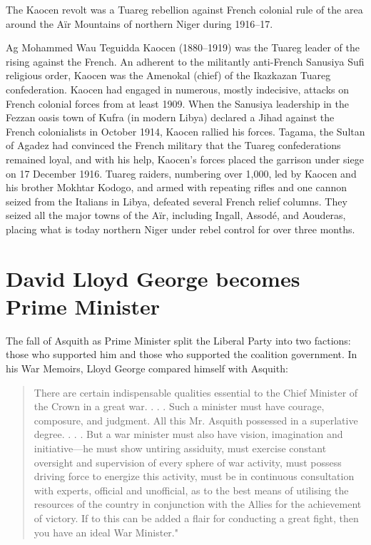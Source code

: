 \documentclass[a4paper,]{book}
\begin{document}
The Kaocen revolt was a Tuareg rebellion against French colonial rule of the area around the Aïr Mountains of northern Niger during 1916–17. 

Ag Mohammed Wau Teguidda Kaocen (1880–1919) was the Tuareg leader of the rising against the French. An adherent to the militantly anti-French Sanusiya Sufi religious order, Kaocen was the Amenokal (chief) of the Ikazkazan Tuareg confederation. Kaocen had engaged in numerous, mostly indecisive, attacks on French colonial forces from at least 1909. When the Sanusiya leadership in the Fezzan oasis town of Kufra (in modern Libya) declared a Jihad against the French colonialists in October 1914, Kaocen rallied his forces. Tagama, the Sultan of Agadez had convinced the French military that the Tuareg confederations remained loyal, and with his help, Kaocen's forces placed the garrison under siege on 17 December 1916. Tuareg raiders, numbering over 1,000, led by Kaocen and his brother Mokhtar Kodogo, and armed with repeating rifles and one cannon seized from the Italians in Libya, defeated several French relief columns. They seized all the major towns of the Aïr, including Ingall, Assodé, and Aouderas, placing what is today northern Niger under rebel control for over three months.

\section{David Lloyd George becomes Prime Minister}

The fall of Asquith as Prime Minister split the Liberal Party into two factions: those who supported him and those who supported the coalition government. In his War Memoirs, Lloyd George compared himself with Asquith:

\begin{quote}
There are certain indispensable qualities essential to the Chief Minister of the Crown in a great war. . . . Such a minister must have courage, composure, and judgment. All this Mr. Asquith possessed in a superlative degree. . . . But a war minister must also have vision, imagination and initiative—he must show untiring assiduity, must exercise constant oversight and supervision of every sphere of war activity, must possess driving force to energize this activity, must be in continuous consultation with experts, official and unofficial, as to the best means of utilising the resources of the country in conjunction with the Allies for the achievement of victory. If to this can be added a flair for conducting a great fight, then you have an ideal War Minister."
\end{quote}
\end{document}
